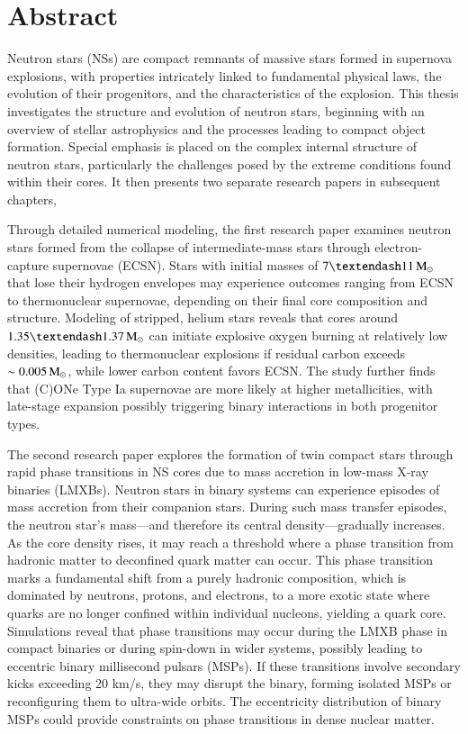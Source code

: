 \documentclass[main.tex]{subfiles}
\begin{document}
    \chapter*{Abstract}
    Neutron stars (NSs) are compact remnants of massive stars formed in supernova explosions, with properties intricately linked to fundamental physical laws, the evolution of their progenitors, and the characteristics of the explosion. This thesis investigates the structure and evolution of neutron stars, beginning with an overview of stellar astrophysics and the processes leading to compact object formation. Special emphasis is placed on the complex internal structure of neutron stars, particularly the challenges posed by the extreme conditions found within their cores. It then presents two separate research papers in subsequent chapters,

    Through detailed numerical modeling, the first research paper examines neutron stars formed from the collapse of intermediate-mass stars through electron-capture supernovae (ECSN). Stars with initial masses of $7–11\msun$ that lose their hydrogen envelopes may experience outcomes ranging from ECSN to thermonuclear supernovae, depending on their final core composition and structure. Modeling of stripped, helium stars reveals that cores around $1.35–1.37\msun$ can initiate explosive oxygen burning at relatively low densities, leading to thermonuclear explosions if residual carbon exceeds $\sim 0.005\mathrm{\,M_\odot}$, while lower carbon content favors ECSN. The study further finds that (C)ONe Type Ia supernovae are more likely at higher metallicities, with late-stage expansion possibly triggering binary interactions in both progenitor types.

    The second research paper explores the formation of twin compact stars through rapid phase transitions in NS cores due to mass accretion in low-mass X-ray binaries (LMXBs).
    Neutron stars in binary systems can experience episodes of mass accretion from their companion stars. During such mass transfer episodes, the neutron star’s mass---and therefore its central density---gradually increases. As the core density rises, it may reach a threshold where a phase transition from hadronic matter to deconfined quark matter can occur. This phase transition marks a fundamental shift from a purely hadronic composition, which is dominated by neutrons, protons, and electrons, to a more exotic state where quarks are no longer confined within individual nucleons, yielding a quark core. Simulations reveal that phase transitions may occur during the LMXB phase in compact binaries or during spin-down in wider systems, possibly leading to eccentric binary millisecond pulsars (MSPs). If these transitions involve secondary kicks exceeding 20 km/s, they may disrupt the binary, forming isolated MSPs or reconfiguring them to ultra-wide orbits. The eccentricity distribution of binary MSPs could provide constraints on phase transitions in dense nuclear matter.
\end{document}
